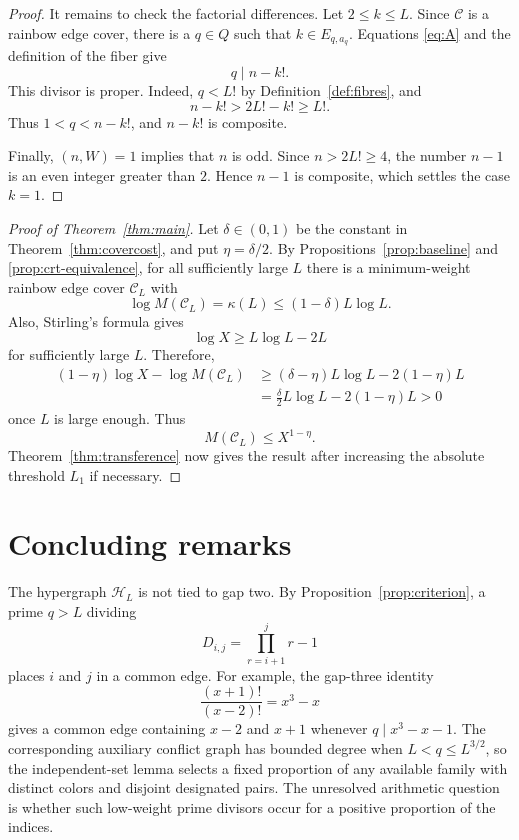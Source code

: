 \documentclass[11pt]{amsart}
\theoremstyle{definition}
\theoremstyle{remark}
\begin{document}
\begin{proof}
It remains to check the factorial differences.  Let $2\leq k\leq L$.
Since $\mathcal C$ is a rainbow edge cover, there is a $q\in Q$ such that
$k\in E_{q,a_q}$.  Equations \eqref{eq:A} and the definition of the fiber
give
\[
q\mid n-k!.
\]
This divisor is proper.  Indeed, $q<L!$ by Definition~\ref{def:fibres}, and
\[
n-k!>2L!-k!\geq L!.
\]
Thus $1<q<n-k!$, and $n-k!$ is composite.

Finally, $(n,W)=1$ implies that $n$ is odd.  Since $n>2L!\geq4$, the number
$n-1$ is an even integer greater than $2$.  Hence $n-1$ is composite, which
settles the case $k=1$.
\end{proof}

\begin{proof}[Proof of Theorem~\ref{thm:main}]
Let $\delta\in(0,1)$ be the constant in Theorem~\ref{thm:covercost}, and
put $\eta=\delta/2$.  By Propositions~\ref{prop:baseline} and
\ref{prop:crt-equivalence}, for all sufficiently large $L$ there is a
minimum-weight rainbow edge cover $\mathcal C_L$ with
\[
\log M(\mathcal C_L)=\kappa(L)
\leq(1-\delta)L\log L.
\]
Also, Stirling's formula gives
\[
\log X\geq L\log L-2L
\]
for sufficiently large $L$.  Therefore,
\begin{align*}
(1-\eta)\log X-\log M(\mathcal C_L)
&\geq(\delta-\eta)L\log L-2(1-\eta)L\\
&=\frac{\delta}{2}L\log L-2(1-\eta)L>0
\end{align*}
once $L$ is large enough.  Thus
\[
M(\mathcal C_L)\leq X^{1-\eta}.
\]
Theorem~\ref{thm:transference} now gives the result after increasing the
absolute threshold $L_1$ if necessary.
\end{proof}

\clearpage
\section{Concluding remarks}

The hypergraph $\mathcal H_L$ is not tied to gap two.  By
Proposition~\ref{prop:criterion}, a prime $q>L$ dividing
\[
D_{i,j}=\prod_{r=i+1}^{j}r-1
\]
places $i$ and $j$ in a common edge.  For example, the gap-three identity
\[
\frac{(x+1)!}{(x-2)!}=x^3-x
\]
gives a common edge containing $x-2$ and $x+1$ whenever
$q\mid x^3-x-1$.  The corresponding auxiliary conflict graph has bounded
degree when $L<q\leq L^{3/2}$, so the independent-set lemma selects a fixed
proportion of any available family with distinct colors and disjoint
designated pairs.  The unresolved arithmetic question is whether such
low-weight prime divisors occur for a positive proportion of the indices.
\end{document}
